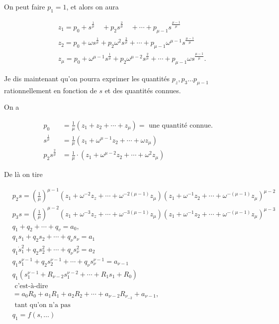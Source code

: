 \documentclass{article}
\begin{document}
On peut faire \(p_{1}=1\), et alors on aura

\[
\begin{aligned}
& z_{1}=p_{0}+s^{\frac{1}{\mu}} \quad+p_{2} s^{\frac{2}{\mu}} \quad+\cdots+p_{\mu-1} s^{\frac{\mu-1}{\mu}} \\
& z_{2}=p_{0}+\omega s^{\frac{1}{\mu}}+p_{2} \omega^{2} s^{\frac{2}{\mu}}+\cdots+p_{\mu-1} \omega^{\mu-1} s^{\frac{\mu-1}{\mu}} \\
& z_{\mu}=p_{0}+\omega^{\mu-1} s^{\frac{1}{\mu}}+p_{2} \omega^{\mu-2} s^{\frac{2}{\mu}}+\cdots+p_{\mu-1} \omega s^{\frac{\mu-1}{\mu}} .
\end{aligned}
\]

Je dis maintenant qu'on pourra exprimer les quantités \(p_{z}, p_{3} \ldots p_{\mu-1}\) rationnellement en fonction de \(s\) et des quantités connues.

On a

\[
\begin{aligned}
p_{0} & =\frac{1}{\mu}\left(z_{1}+z_{2}+\cdots+z_{\mu}\right)=\text { une quantité connue. } \\
s^{\frac{1}{\mu}} & =\frac{1}{\mu}\left(z_{1}+\omega^{\mu-1} z_{2}+\cdots+\omega z_{\mu}\right) \\
p_{2} s^{\frac{2}{\mu}} & =\frac{1}{\mu} \cdot\left(z_{1}+\omega^{\mu-2} z_{2}+\cdots+\omega^{2} z_{\mu}\right)
\end{aligned}
\]

De là on tire

\[
\begin{aligned}
& p_{2} s=\left(\frac{1}{\mu}\right)^{\mu-1}\left(z_{1}+\omega^{-2} z_{z}+\cdots+\omega^{-2(\mu-1)} z_{\mu}\right)\left(z_{1}+\omega^{-1} z_{2}+\cdots+\omega^{-(\mu-1)} z_{\mu}\right)^{\mu-2} \\
& p_{3} s=\left(\frac{1}{\mu}\right)^{\mu-2}\left(z_{1}+\omega^{-3} z_{z}+\cdots+\omega^{-3(\mu-1)} z_{\mu}\right)\left(z_{1}+\omega^{-1} z_{2}+\cdots+\omega^{-(\mu-1)} z_{\mu}\right)^{\mu-3} \\
& q_{1}+q_{2}+\cdots+q_{v}=a_{0}, \\
& q_{1} s_{1}+q_{2} s_{2}+\cdots+q_{\nu} s_{\nu}=a_{1} \\
& q_{1} \dot{s}_{1}^{2}+q_{2} s_{2}^{2}+\cdots+q_{\nu} s_{\nu}^{2}=a_{2} \\
& q_{1} s_{1}^{\nu-1}+q_{2} s_{2}^{\nu-1}+\cdots+q_{\nu} s_{\nu}^{\nu-1}=a_{\nu-1} \\
& q_{1}\left(s_{1}^{\nu-1}+R_{\nu-2} s_{1}^{\nu-2}+\cdots+R_{1} s_{1}+R_{0}\right) \\
& \text { c'est-à-dire } \\
& =a_{0} R_{0}+a_{1} R_{1}+a_{2} R_{2}+\cdots+a_{\nu-2} R_{\nu_{-2}}+a_{\nu-1}, \\
& \text { tant qu'on n'a pas } \\
& q_{1}=f(s, \ldots)
\end{aligned}
\]
\end{document}
